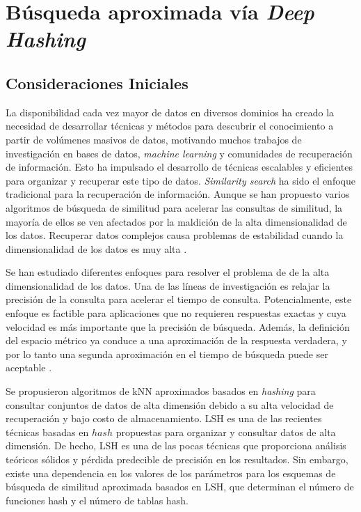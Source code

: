 
\chapter{Búsqueda aproximada vía \textit{Deep Hashing}}

\section{Consideraciones Iniciales}
 
La disponibilidad cada vez mayor de datos en diversos dominios ha creado la necesidad de desarrollar técnicas y métodos para descubrir el conocimiento a partir de volúmenes masivos de datos, motivando muchos trabajos de investigación en bases de datos, \textit{machine learning} y comunidades de recuperación de información. Esto ha impulsado el desarrollo de técnicas escalables y eficientes para organizar y recuperar este tipo de datos. \textit{Similarity search} ha sido el enfoque tradicional para la recuperación de información. Aunque se han propuesto varios algoritmos de búsqueda de similitud para acelerar las consultas de similitud, la mayoría de ellos se ven afectados por la maldición de la alta dimensionalidad de los datos. Recuperar datos complejos causa problemas de estabilidad cuando la dimensionalidad de los datos es muy alta \cite{aleman_high_dimensional}.


Se han estudiado diferentes enfoques para resolver el problema de de la alta dimensionalidad de los datos. Una de las líneas de investigación es relajar la precisión de la consulta para acelerar el tiempo de consulta. Potencialmente, este enfoque es factible para aplicaciones que no requieren respuestas exactas y cuya velocidad es más importante que la precisión de búsqueda. Además, la definición del espacio métrico ya conduce a una aproximación de la respuesta verdadera, y por lo tanto una segunda aproximación en el tiempo de búsqueda puede ser aceptable \cite{cit:avez99searching}.

Se propusieron algoritmos de kNN aproximados basados en \textit{hashing} para consultar conjuntos de datos de alta dimensión debido a su alta velocidad de recuperación y bajo costo de almacenamiento. \acf{LSH} \cite{lsh} es una de las recientes técnicas basadas en $hash$ propuestas para organizar y consultar datos de alta dimensión. De hecho, LSH es una de las pocas técnicas que proporciona análisis teóricos sólidos y pérdida predecible de precisión en los resultados. Sin embargo, existe una dependencia en los valores de los parámetros para los esquemas de búsqueda de similitud aproximada basados en LSH, que determinan el número de funciones hash y el número de tablas hash.

